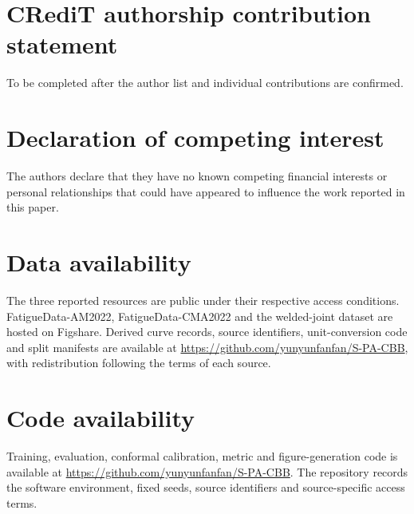 \documentclass[a4paper,fleqn]{cas-dc}
\begin{document}
\section*{CRediT authorship contribution statement}
To be completed after the author list and individual contributions are confirmed.

\section*{Declaration of competing interest}
The authors declare that they have no known competing financial interests or personal relationships that could have appeared to influence the work reported in this paper.

\section*{Data availability}
The three reported resources are public under their respective access conditions. FatigueData-AM2022, FatigueData-CMA2022 and the welded-joint dataset are hosted on Figshare. Derived curve records, source identifiers, unit-conversion code and split manifests are available at \url{https://github.com/yunyunfanfan/S-PA-CBB}, with redistribution following the terms of each source.

\section*{Code availability}
Training, evaluation, conformal calibration, metric and figure-generation code is available at \url{https://github.com/yunyunfanfan/S-PA-CBB}. The repository records the software environment, fixed seeds, source identifiers and source-specific access terms.



\end{document}
